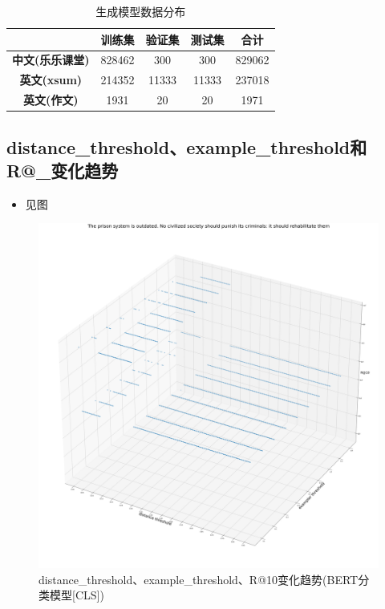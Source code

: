 \documentclass[11pt]{article}
\begin{document}
\begin{CJK}{UTF8}{gkai}
\begin{table}[htbp]
  \centering
  \begin{tabular}{c|cccc}
    \hline
    & \textbf{训练集} & \textbf{验证集} & \textbf{测试集} & \textbf{合计} \\
    \hline
    \textbf{中文(乐乐课堂)} & 828462 & 300   & 300   & 829062 \\
    \hline
    \textbf{英文(xsum)} & 214352 & 11333 & 11333 & 237018 \\
    \hline
    \textbf{英文(作文)} & 1931  & 20    & 20    & 1971 \\
    \hline
  \end{tabular}%
  \caption{生成模型数据分布}
  \label{tab:addlabel}%
\end{table}%

\subsection{distance\_threshold、example\_threshold和R@\_变化趋势}
\begin{itemize}
  \item 见图
\end{itemize}

\begin{figure}[htbp]\small
  \centering
  \includegraphics[width=1.0\linewidth]{prompt_0005_R@10.png}
  \caption{distance\_threshold、example\_threshold、R@10变化趋势(BERT分类模型[CLS])}
  \label{framework}
\end{figure}


\end{CJK}
\end{document}
